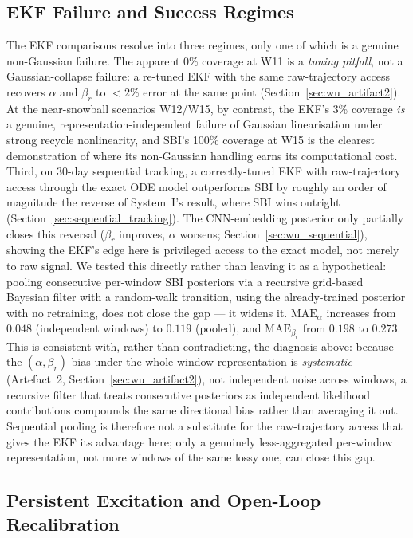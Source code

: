 \documentclass[aps,pre,twocolumn,superscriptaddress]{revtex4-2}
\begin{document}
\subsection{EKF Failure and Success Regimes}
\label{sec:disc_ekf_regimes}

The EKF comparisons resolve into three regimes, only one of which is a
genuine non-Gaussian failure. The apparent 0\% coverage at W11 is a
\emph{tuning pitfall}, not a Gaussian-collapse failure: a re-tuned EKF with
the same raw-trajectory access recovers $\alpha$ and $\beta_r$ to $<2$\%
error at the same point (Section~\ref{sec:wu_artifact2}). At the
near-snowball scenarios W12/W15, by contrast, the EKF's 3\% coverage
\emph{is} a genuine, representation-independent failure of Gaussian
linearisation under strong recycle nonlinearity, and SBI's 100\% coverage at
W15 is the clearest demonstration of where its non-Gaussian
handling earns its computational cost. Third, on 30-day sequential tracking,
a correctly-tuned EKF with raw-trajectory access through the exact ODE model
outperforms SBI by roughly an order of magnitude  the reverse of System~I's
result, where SBI wins outright (Section~\ref{sec:sequential_tracking}). The
CNN-embedding posterior only partially closes this reversal ($\beta_r$
improves, $\alpha$ worsens; Section~\ref{sec:wu_sequential}), showing the
EKF's edge here is privileged access to the exact model, not merely to raw
signal. We tested this directly rather than leaving it as a hypothetical:
pooling consecutive per-window SBI posteriors via a recursive grid-based
Bayesian filter with a random-walk transition, using the already-trained
posterior with no retraining, does not close the gap --- it widens it.
$\mathrm{MAE}_\alpha$ increases from $0.048$ (independent windows) to
$0.119$ (pooled), and $\mathrm{MAE}_{\beta_r}$ from $0.198$ to $0.273$. This
is consistent with, rather than contradicting, the diagnosis above: because
the $(\alpha,\beta_r)$ bias under the whole-window representation is
\emph{systematic} (Artefact~2, Section~\ref{sec:wu_artifact2}), not
independent noise across windows, a recursive filter that treats
consecutive posteriors as independent likelihood contributions compounds
the same directional bias rather than averaging it out. Sequential pooling
is therefore not a substitute for the raw-trajectory access that gives the
EKF its advantage here; only a genuinely less-aggregated per-window
representation, not more windows of the same lossy one, can close this gap.

\subsection{Persistent Excitation and Open-Loop Recalibration}
\label{sec:disc_excitation}
\end{document}
